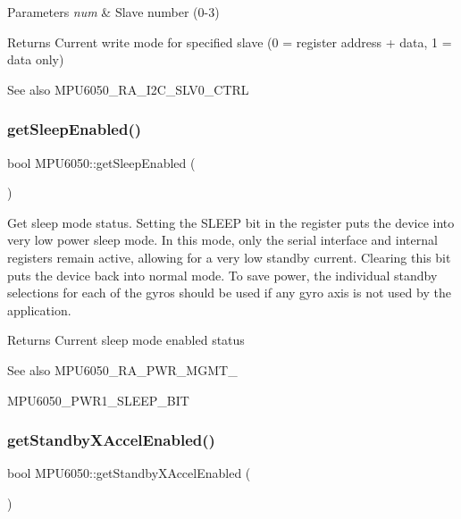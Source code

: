 \begin{DoxyParams}{Parameters}
{\em num} & Slave number (0-\/3) \\
\hline
\end{DoxyParams}
\begin{DoxyReturn}{Returns}
Current write mode for specified slave (0 = register address + data, 1 = data only) 
\end{DoxyReturn}
\begin{DoxySeeAlso}{See also}
M\+P\+U6050\+\_\+\+R\+A\+\_\+\+I2\+C\+\_\+\+S\+L\+V0\+\_\+\+C\+T\+RL 
\end{DoxySeeAlso}
\mbox{\label{class_m_p_u6050_a196404ef04b959083d4bf5e6f1cd8b98}} 
\subsubsection{\texorpdfstring{getSleepEnabled()}{getSleepEnabled()}}
{\footnotesize\ttfamily bool M\+P\+U6050\+::get\+Sleep\+Enabled (\begin{DoxyParamCaption}{ }\end{DoxyParamCaption})}

Get sleep mode status. Setting the S\+L\+E\+EP bit in the register puts the device into very low power sleep mode. In this mode, only the serial interface and internal registers remain active, allowing for a very low standby current. Clearing this bit puts the device back into normal mode. To save power, the individual standby selections for each of the gyros should be used if any gyro axis is not used by the application. \begin{DoxyReturn}{Returns}
Current sleep mode enabled status 
\end{DoxyReturn}
\begin{DoxySeeAlso}{See also}
M\+P\+U6050\+\_\+\+R\+A\+\_\+\+P\+W\+R\+\_\+\+M\+G\+M\+T\+\_ 

M\+P\+U6050\+\_\+\+P\+W\+R1\+\_\+\+S\+L\+E\+E\+P\+\_\+\+B\+IT 
\end{DoxySeeAlso}
\mbox{\label{class_m_p_u6050_a99261a04739fdb7a9a1c5b67ce3e710e}} 
\subsubsection{\texorpdfstring{getStandbyXAccelEnabled()}{getStandbyXAccelEnabled()}}
{\footnotesize\ttfamily bool M\+P\+U6050\+::get\+Standby\+X\+Accel\+Enabled (\begin{DoxyParamCaption}{ }\end{DoxyParamCaption})}

